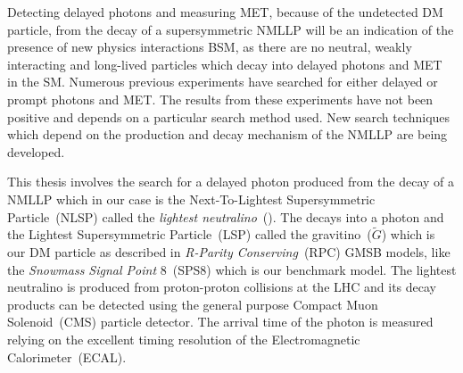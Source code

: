\newline
Detecting delayed photons  and  measuring MET, because of the undetected DM particle, from the decay of a supersymmetric NMLLP will be an indication of the presence of new physics interactions BSM, as there are no neutral, weakly interacting and long-lived particles which decay into delayed photons and MET in the SM. Numerous previous experiments have searched for either delayed or prompt photons and MET.
The results from these experiments have not been positive and depends on a particular search method  used. New search techniques which depend on the production and decay mechanism of the NMLLP are being developed. %
\par %
This thesis involves the search for a delayed photon produced from the decay of a NMLLP which in our case is the Next-To-Lightest Supersymmetric Particle~(NLSP) called the \textit{lightest neutralino}~(\PSneutralinoOne). The \PSneutralinoOne decays into a photon and the Lightest Supersymmetric Particle~(LSP) called the gravitino~($\tilde{G}$) which is our DM particle as described in \textit{R-Parity Conserving}~(RPC) GMSB models\cite{KOlive}, like the \textit{Snowmass Signal Point} 8~(SPS8) which is our benchmark model. The lightest neutralino is produced from proton-proton collisions at the LHC and its decay products can be detected using the general purpose Compact Muon Solenoid~(CMS) particle detector. The arrival time of the photon is measured relying on the excellent timing resolution of the Electromagnetic Calorimeter~(ECAL).
